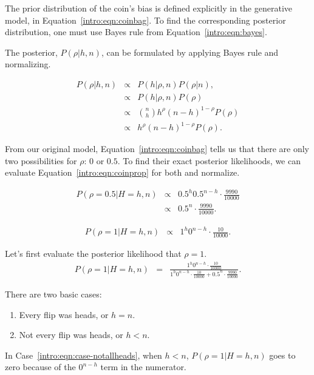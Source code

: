 The prior distribution of the coin's bias is defined explicitly in the generative model, in Equation~\ref{intro:eqn:coinbag}. To find the corresponding posterior distribution, one must use Bayes rule from Equation~\ref{intro:eqn:bayes}.

The posterior, $P(\rho|h,n)$, can be formulated by applying Bayes rule and normalizing.

\begin{eqnarray}
P(\rho|h,n) & \propto & P(h|\rho,n)P(\rho|n),\\
\label{intro:eqn:coinprop} & \propto & P(h|\rho,n)P(\rho)\\
&\propto& {n \choose h} h^\rho (n-h)^{1-\rho} P(\rho)\\
&\propto& h^\rho (n-h)^{1-\rho} P(\rho).
\end{eqnarray}

From our original model, Equation~\ref{intro:eqn:coinbag} tells us that there are only two possibilities for $\rho$: $0$ or $0.5$. To find their exact posterior likelihoods, we can evaluate Equation~\ref{intro:eqn:coinprop} for both and normalize.

\begin{eqnarray}
P(\rho=0.5|H=h,n) & \propto & {0.5}^h {0.5}^{n-h} \cdot \frac{9990}{10000}\\
& \propto & {0.5}^n \cdot \frac{9990}{10000}.
\end{eqnarray}

\begin{eqnarray}
P(\rho=1|H=h,n) & \propto &  1^h 0^{n-h} \cdot \frac{10}{10000}.
\end{eqnarray}

Let's first evaluate the posterior likelihood that $\rho=1$.
\begin{eqnarray}
\label{intro:eqn:coin-post}P(\rho=1|H=h,n) & = & \frac{1^h 0^{n-h} \cdot \frac{10}{10000}}{1^h 0^{n-h} \cdot \frac{10}{10000}+{0.5}^n \cdot \frac{9990}{10000}}.
\end{eqnarray}

There are two basic cases:
\begin{enumerate}
\item \label{intro:eqn:case-notallheads} Every flip was heads, or $h=n$.
\item \label{intro:eqn:case-allheads} Not every flip was heads, or $h<n$.
\end{enumerate}

In Case~\ref{intro:eqn:case-notallheads}, when $h<n$, $P(\rho=1|H=h,n)$ goes to zero because of the $0^{n-h}$ term in the numerator.

